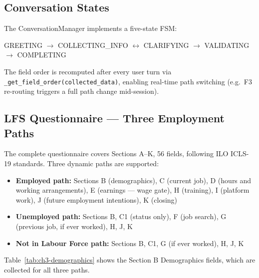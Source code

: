 \subsection{Conversation States}

The ConversationManager implements a five-state FSM:
\begin{center}
GREETING $\longrightarrow$ COLLECTING\_INFO
$\longleftrightarrow$ CLARIFYING $\longrightarrow$
VALIDATING $\longrightarrow$ COMPLETING
\end{center}

The field order is recomputed after every user turn via
\texttt{\_\-get\_\-field\_\-order(collected\_\-data)}, enabling real-time path
switching (e.g.\ F3 re-routing triggers a full path change mid-session).

\subsection{LFS Questionnaire — Three Employment Paths}

The complete questionnaire covers Sections A--K, 56 fields, following ILO
ICLS-19 standards.
Three dynamic paths are supported:

\begin{itemize}
  \item \textbf{Employed path:} Sections B (demographics), C (current job),
  D (hours and working arrangements), E (earnings --- wage gate), H (training),
  I (platform work), J (future employment intentions), K (closing)
  \item \textbf{Unemployed path:} Sections B, C1 (status only), F (job search),
  G (previous job, if ever worked), H, J, K
  \item \textbf{Not in Labour Force path:} Sections B, C1, G (if ever worked),
  H, J, K
\end{itemize}

Table~\ref{tab:ch3-demographics} shows the Section B Demographics fields,
which are collected for all three paths.

